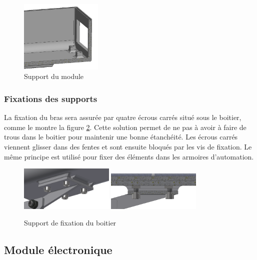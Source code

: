\begin{figure}[H]
    \centering
    \includegraphics[width=0.35\textwidth]{Images/photos_PGA/fixationbaseModule.PNG}
    \caption{Support du module}
    \label{fig:fixbase}
\end{figure}

\subsubsection{Fixations des supports}

La fixation du bras sera assurée par quatre écrous carrés situé sous le boitier, comme le montre la figure 
\ref{fig:supportfix}. Cette solution permet de 
ne pas à avoir à faire de trous dans le boitier pour maintenir une bonne étanchéité. Les écrous carrés viennent
glisser dans des fentes et sont ensuite bloqués par les vis de fixation. Le même principe est utilisé pour 
fixer des éléments dans les armoires d'automation.

\begin{figure}[H]
    \centering
    \includegraphics[width=0.4\textwidth]{Images/photos_PGA/fixdessous2.PNG}
    \includegraphics[width=0.4\textwidth]{Images/photos_PGA/écroucarré.PNG}
    \caption{Support de fixation du boitier}
    \label{fig:supportfix}
\end{figure}

\subsection{Module électronique}

